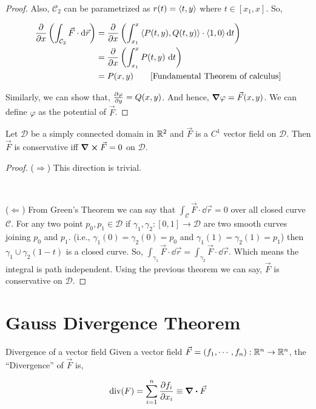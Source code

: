 \documentclass[../Analysis-3.tex]{subfiles}
\begin{document}
\begin{proof}
  Also, $\mathcal{C}_2$ can be parametrized as $r(t) = \left\langle {t}, {y} \right\rangle$ where $t \in [x_1,x]$. So,

  \begin{align*}
    \pdv{x} \left(\int_{\mathcal{C}_2} \vec{F} \cdot \dd{\vec{r}}\right)
     & = \pdv{x} \left( \int_{x_1}^x \left\langle {P(t,y)}, {Q(t,y)} \right\rangle \cdot \left\langle {1}, {0} \right\rangle \dd{t} \right) \\
     & = \pdv{x} \left( \int_{x_1}^x P(t,y) \, \dd{t} \right)                             \\
     & = P(x,y) \qquad \text{[Fundamental Theorem of calculus]}
  \end{align*}

  Similarly, we can show that, $\pdv{\varphi}{y} = Q(x,y)$. And hence, $\grad\varphi = \vec{F}(x,y)$. We can define $\varphi$ as the potential of $\vec{F}$.
\end{proof}

\begin{Thm}{}{}
  Let $\mathcal{D}$ be a simply connected domain in $\mathbb{R}^2$ and $\vec{F}$ is a $C^1$ vector field on $\mathcal{D}$. Then $\vec{F}$ is conservative iff $\curl \vec{F} = 0$ on $\mathcal{D}$.
\end{Thm}

\begin{proof}
  ($\Rightarrow$) This direction is trivial.

  \

  ($\Leftarrow$) From Green's Theorem we can say that $ \displaystyle\int_{\mathcal{C}} \vec{F} \cdot \dd{\vec{r}} = 0$ over all closed curve $\mathcal{C}$. For any two point $p_0,p_1 \in \mathcal{D}$ if $\gamma_1, \gamma_2 : [0,1] \to \mathcal{D}$ are two smooth curves joining $p_0$ and $p_1$. (i.e., $\gamma_1(0) = \gamma_2 (0) = p_0$ and $\gamma_1(1) = \gamma_2(1) = p_1$) then $\gamma_1 \cup \gamma_2(1-t)$ is a closed curve. So, $ \displaystyle\int_{\gamma_1} \vec{F} \cdot \dd{\vec{r}}  = \displaystyle\int_{\gamma_2} \vec{F} \cdot \dd{\vec{r}}$. Which means the integral is path independent. Using the previous theorem we can say, $\vec{F}$ is conservative on $\mathcal{D}$.
\end{proof}

\section{Gauss Divergence Theorem}

\begin{Def}{Divergence of a vector field}{}
  \small  Given a vector field $\vec{F} = (f_1,\cdots, f_n) : \mathbb{R}^n \to \mathbb{R}^n $, the ``Divergence'' of $\vec{F}$ is,

  \[\text{div}(F) = \sum_{i=1}^{n} \pdv{f_i}{x_i} \equiv \div \vec{F}\]
\end{Def}
\end{document}
